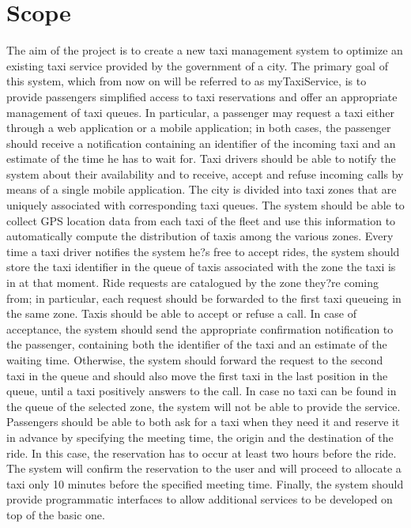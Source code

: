 \section{Scope}
The aim of the project is to create a new taxi management system to optimize an existing taxi service provided by the government of a city. The primary goal of this system, which from now on will be referred to as myTaxiService, is to provide passengers simplified access to taxi reservations and offer an appropriate management of taxi queues. In particular, a passenger may request a taxi either through a web application or a mobile application; in both cases, the passenger should receive a notification containing an identifier of the incoming taxi and an estimate of the time he has to wait for. Taxi drivers should be able to notify the system about their availability and to receive, accept and refuse incoming calls by means of a single mobile application. The city is divided into taxi zones that are uniquely associated with corresponding taxi queues. The system should be able to collect GPS location data from each taxi of the fleet and use this information to automatically compute the distribution of taxis among the various zones. Every time a taxi driver notifies the system he?s free to accept rides, the system should store the taxi identifier in the queue of taxis associated with the zone the taxi is in at that moment. Ride requests are catalogued by the zone they?re coming from; in particular, each request should be forwarded to the first taxi queueing in the same zone. Taxis should be able to accept or refuse a call. In case of acceptance, the system should send the appropriate confirmation notification to the passenger, containing both the identifier of the taxi and an estimate of the waiting time. Otherwise, the system should forward the request to the second taxi in the queue and should also move the first taxi in the last position in the queue, until a taxi positively answers to the call. In case no taxi can be found in the queue of the selected zone, the system will not be able to provide the service. Passengers should be able to both ask for a taxi when they need it and reserve it in advance by specifying the meeting time, the origin and the destination of the ride. In this case, the reservation has to occur at least two hours before the ride. The system will confirm the reservation to the user and will proceed to allocate a taxi only 10 minutes before the specified meeting time. Finally, the system should provide programmatic interfaces to allow additional services to be developed on top of the basic one.


